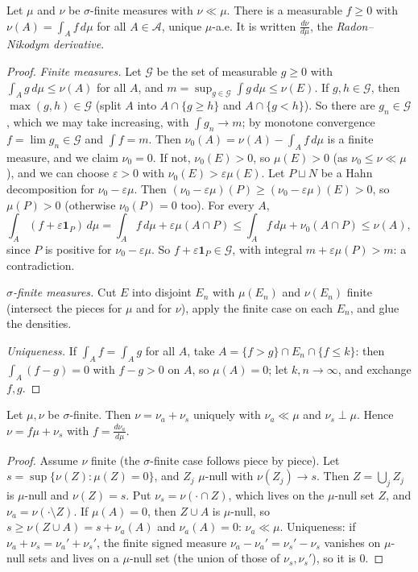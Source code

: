 \begin{theorem}\label{thm:rn}
Let $\mu$ and $\nu$ be $\sigma$-finite measures with $\nu\ll\mu$. There is a measurable $f\ge0$ with $\nu(A)=\int_Af\,d\mu$ for all $A\in\mathcal A$, unique $\mu$-a.e. It is written $\frac{d\nu}{d\mu}$, the
\emph{Radon--Nikodym derivative}.
\end{theorem}
\begin{proof}
\emph{Finite measures.} Let $\mathcal G$ be the set of measurable $g\ge0$ with $\int_Ag\,d\mu\le\nu(A)$ for all $A$, and $m=\sup_{g\in\mathcal G}\int g\,d\mu\le\nu(E)$. If $g,h\in\mathcal G$, then $\max(g,h)\in\mathcal G$ (split $A$
into $A\cap\{g\ge h\}$ and $A\cap\{g<h\}$). So there are $g_n\in\mathcal G$, which we may take increasing, with $\int g_n\to m$; by monotone convergence $f=\lim g_n\in\mathcal G$ and $\int f=m$. Then
$\nu_0(A)=\nu(A)-\int_Af\,d\mu$ is a finite measure, and we claim $\nu_0=0$. If not, $\nu_0(E)>0$, so $\mu(E)>0$ (as $\nu_0\le\nu\ll\mu$), and we can choose $\varepsilon>0$ with $\nu_0(E)>\varepsilon\mu(E)$. Let $P\sqcup N$ be a
Hahn decomposition for $\nu_0-\varepsilon\mu$. Then $(\nu_0-\varepsilon\mu)(P)\ge(\nu_0-\varepsilon\mu)(E)>0$, so $\mu(P)>0$ (otherwise $\nu_0(P)=0$ too). For every $A$,
\[\int_A(f+\varepsilon\mathbf 1_P)\,d\mu=\int_Af\,d\mu+\varepsilon\mu(A\cap P)\le\int_Af\,d\mu+\nu_0(A\cap P)\le\nu(A),\]
since $P$ is positive for $\nu_0-\varepsilon\mu$. So $f+\varepsilon\mathbf 1_P\in\mathcal G$, with integral $m+\varepsilon\mu(P)>m$: a contradiction.

\emph{$\sigma$-finite measures.} Cut $E$ into disjoint $E_n$ with $\mu(E_n)$ and $\nu(E_n)$ finite (intersect the pieces for $\mu$ and for $\nu$), apply the finite case on each $E_n$, and glue the densities.

\emph{Uniqueness.} If $\int_Af=\int_Ag$ for all $A$, take $A=\{f>g\}\cap E_n\cap\{f\le k\}$: then $\int_A(f-g)=0$ with $f-g>0$ on $A$, so $\mu(A)=0$; let $k,n\to\infty$, and exchange $f,g$.
\end{proof}

\begin{theorem}\label{thm:lebdecomp}
Let $\mu,\nu$ be $\sigma$-finite. Then $\nu=\nu_a+\nu_s$ uniquely with $\nu_a\ll\mu$ and $\nu_s\perp\mu$. Hence $\nu=f\mu+\nu_s$ with $f=\frac{d\nu_a}{d\mu}$.
\end{theorem}
\begin{proof}
Assume $\nu$ finite (the $\sigma$-finite case follows piece by piece). Let $s=\sup\{\nu(Z):\mu(Z)=0\}$, and $Z_j$ $\mu$-null with $\nu(Z_j)\to s$. Then $Z=\bigcup_jZ_j$ is $\mu$-null and $\nu(Z)=s$. Put
$\nu_s=\nu(\cdot\cap Z)$, which lives on the $\mu$-null set $Z$, and $\nu_a=\nu(\cdot\setminus Z)$. If $\mu(A)=0$, then $Z\cup A$ is $\mu$-null, so $s\ge\nu(Z\cup A)=s+\nu_a(A)$ and $\nu_a(A)=0$: $\nu_a\ll\mu$. Uniqueness: if
$\nu_a+\nu_s=\nu_a'+\nu_s'$, the finite signed measure $\nu_a-\nu_a'=\nu_s'-\nu_s$ vanishes on $\mu$-null sets and lives on a $\mu$-null set (the union of those of $\nu_s,\nu_s'$), so it is $0$.
\end{proof}

